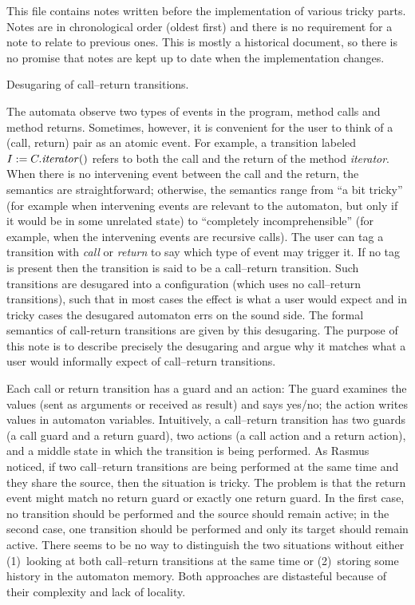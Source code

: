 \def\para #1.{\noindent{\it#1.\enspace}}

This file contains notes written before the implementation of various tricky parts.
Notes are in chronological order (oldest first) and there is no requirement for a note to relate to previous ones.
This is mostly a historical document, so there is no promise that notes are kept up to date when the implementation changes.

\beginsection Desugaring of call--return transitions. %

\para Background.
The automata observe two types of events in the program, method calls and method returns.
Sometimes, however, it is convenient for the user to think of a (call, return) pair as an atomic event.
For example, a transition labeled $I:=C.{\it iterator}()$ refers to both the call and the return of the method {\it iterator}.
When there is no intervening event between the call and the return, the semantics are straightforward; otherwise, the semantics range from ``a bit tricky'' (for example when intervening events are relevant to the automaton, but only if it would be in some unrelated state) to ``completely incomprehensible'' (for example, when the intervening events are recursive calls).
The user can tag a transition with {\it call\/} or {\it return\/} to say which type of event may trigger it.
If no tag is present then the transition is said to be a call--return transition.
Such transitions are desugared into a configuration (which uses no call--return transitions), such that in most cases the effect is what a user would expect and in tricky cases the desugared automaton errs on the sound side.
The formal semantics of call-return transitions are given by this desugaring.
The purpose of this note is to describe precisely the desugaring and argue why it matches what a user would informally expect of call--return transitions.

Each call or return transition has a guard and an action:
The guard examines the values (sent as arguments or received as result) and says yes/no; the action writes values in automaton variables.
Intuitively, a call--return transition has two guards (a call guard and a return guard), two actions (a call action and a return action), and a middle state in which the transition is being performed.
As Rasmus noticed, if two call--return transitions are being performed at the same time and they share the source, then the situation is tricky.
The problem is that the return event might match no return guard or exactly one return guard.
In the first case, no transition should be performed and the source should remain active; in the second case, one transition should be performed and only its target should remain active.
There seems to be no way to distinguish the two situations without either (1)~looking at both call--return transitions at the same time or (2)~storing some history in the automaton memory.
Both approaches are distasteful because of their complexity and lack of locality.

